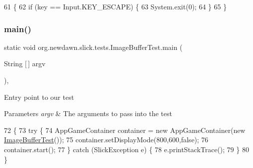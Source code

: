 \begin{DoxyCode}
61                                             \{
62         \textcolor{keywordflow}{if} (key == Input.KEY\_ESCAPE) \{
63             System.exit(0);
64         \}
65     \}
\end{DoxyCode}
\mbox{\label{classorg_1_1newdawn_1_1slick_1_1tests_1_1_image_buffer_test_a02f4433e945ad1759d1de32c3f70757f}} 
\subsubsection{\texorpdfstring{main()}{main()}}
{\footnotesize\ttfamily static void org.\+newdawn.\+slick.\+tests.\+Image\+Buffer\+Test.\+main (\begin{DoxyParamCaption}\item[{String \mbox{[}$\,$\mbox{]}}]{argv }\end{DoxyParamCaption})\hspace{0.3cm}{\ttfamily [inline]}, {\ttfamily [static]}}

Entry point to our test


\begin{DoxyParams}{Parameters}
{\em argv} & The arguments to pass into the test \\
\hline
\end{DoxyParams}

\begin{DoxyCode}
72                                            \{
73         \textcolor{keywordflow}{try} \{
74             AppGameContainer container = \textcolor{keyword}{new} AppGameContainer(\textcolor{keyword}{new} 
      \mbox{\hyperlink{classorg_1_1newdawn_1_1slick_1_1tests_1_1_image_buffer_test_a7de8d41dc4225e5ebbebf56f60f8990a}{ImageBufferTest}}());
75             container.setDisplayMode(800,600,\textcolor{keyword}{false});
76             container.start();
77         \} \textcolor{keywordflow}{catch} (SlickException e) \{
78             e.printStackTrace();
79         \}
80     \}
\end{DoxyCode}
\mbox{\label{classorg_1_1newdawn_1_1slick_1_1tests_1_1_image_buffer_test_af45d248a46ad54a7c7afb91e6b0f8d1b}} 
